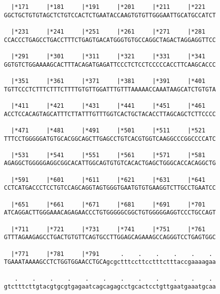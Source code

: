\documentclass{article}
\begin{document}
\begin{Verbatim}
  |*171     |*181     |*191     |*201     |*211     |*221   
GGCTGCTGTGTAGCTCTGTCCACTCTGAATACCAAGTGTGTTGGGAATTGCATGCCATCT
                                                            
  |*231     |*241     |*251     |*261     |*271     |*281   
CCACCCTGAGCCTGACCTTTCTGAGTGACATGGGTGTGCCAGGCTAGACTAGGAGGTTCC
                                                            
  |*291     |*301     |*311     |*321     |*331     |*341   
GGTGTCTGGAAAAGCACTTTACAGATGAGATTCCCTCTCCTCCCCCACCTTCAAGCACCC
                                                            
  |*351     |*361     |*371     |*381     |*391     |*401   
TGTTCCCTCTTTCTTTCTTTTGTGTTGGATTTGTTTAAAAACCAAATAAGCATCTGTGTA
                                                            
  |*411     |*421     |*431     |*441     |*451     |*461   
ACCTCCACAGTAGCATTTCTTATTTGTTTGGTCACTGCTACACCTTAGCAGCTCTTCCCC
                                                            
  |*471     |*481     |*491     |*501     |*511     |*521   
TTTCCTGGGGGATGTGCACGGCAGCTTGAGCCTGTCACGTGGTCAAGGCCCGGCCCCATC
                                                            
  |*531     |*541     |*551     |*561     |*571     |*581   
AGAGGCTGGGGGAGGCGGCACATTGGCAGTGTGTCACACTGAGCTGGGCACCACAGGCTG
                                                            
  |*591     |*601     |*611     |*621     |*631     |*641   
CCTCATGACCCTCCTGTCCAGCAGGTAGTGGGTGAATGTGTGAAGGTCTTGCCTGAATCC
                                                            
  |*651     |*661     |*671     |*681     |*691     |*701   
ATCAGGACTTGGGAAACAGAGAACCCTGTGGGGGCGGCTGTGGGGGAGGTCCCTGCCAGT
                                                            
  |*711     |*721     |*731     |*741     |*751     |*761   
GTTTAGAAGAGCCTGACTGTGTTCAGTGCCTTGGAGCAGAAAGCCAGGGTCCTGAGTGGC
                                                            
  |*771     |*781     |*791      .    .    .    .    .    . 
TGAAATAAAAGCCTCTGGTGGAACCTGCAgcgctttccttcctttctttaccgaaaagaa
                                                            
   .    .    .    .    .    .    .    .    .    .    .    . 
gtctttcttgtacgtgcgtgagaatcagcagagcctgcactcctgttgaatgaaatgcaa
                                                            

\end{Verbatim}
\end{document}
